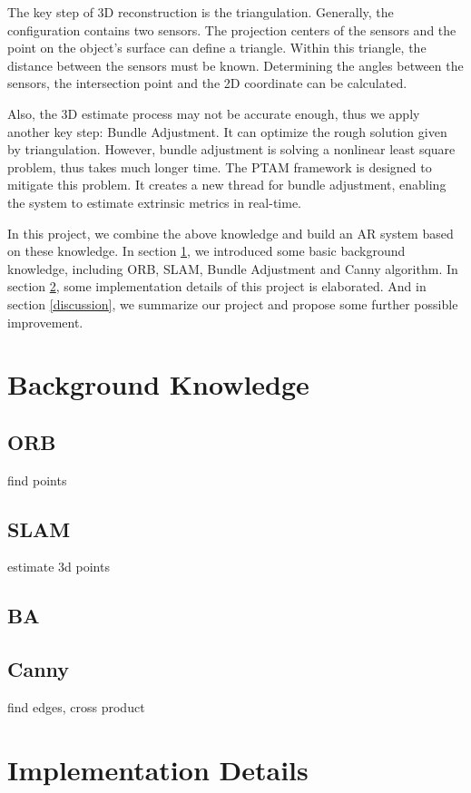 \documentclass[paper=a4, fontsize=14pt]{scrartcl}
\numberwithin{equation}{section}        %
\numberwithin{figure}{section}          %
\numberwithin{table}{section}               %
\begin{document}
The key step of 3D reconstruction is the triangulation.
Generally, the configuration contains two sensors.
The projection centers of the sensors and the point on the object's surface can define a triangle.
Within this triangle, the distance between the sensors must be known.
Determining the angles between the sensors, the intersection point and the 2D coordinate can be calculated.

Also, the 3D estimate process may not be accurate enough, thus we apply another key step: Bundle Adjustment.
It can optimize the rough solution given by triangulation.
However, bundle adjustment is solving a nonlinear least square problem, thus takes much longer time.
The PTAM framework is designed to mitigate this problem.
It creates a new thread for bundle adjustment, enabling the system to estimate extrinsic metrics in real-time.

In this project, we combine the above knowledge and build an AR system based on these knowledge.
In section \ref{background}, we introduced some basic background knowledge, including ORB, SLAM, Bundle Adjustment and Canny algorithm.
In section \ref{implementation}, some implementation details of this project is elaborated.
And in section \ref{discussion}, we summarize our project and propose some further possible improvement.


\section{Background Knowledge}\label{background}

\subsection{ORB} find points

\subsection{SLAM} estimate 3d points

\subsection{BA}

\subsection{Canny} find edges, cross product

\section{Implementation Details}\label{implementation}
\end{document}
